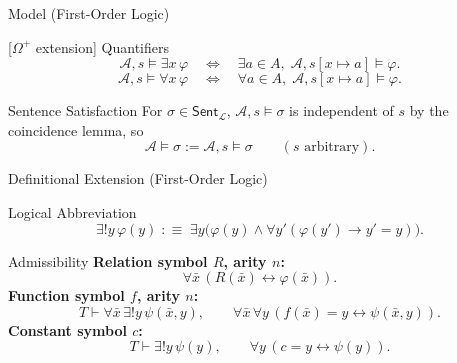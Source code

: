 \documentclass[12pt, a4paper]{report}
\begin{document}
\begin{modelbox}{Model (First-Order Logic)}
\begin{model}
\begin{modelcomponent}{[\(\Omega^{+}\) extension] Quantifiers}
\[
  \mathcal A,s\models\exists x\,\varphi
  \quad\Longleftrightarrow\quad
  \exists a\in A,\;\mathcal A,s[x\mapsto a]\models\varphi.
\]
\[
  \mathcal A,s\models\forall x\,\varphi
  \quad\Longleftrightarrow\quad
  \forall a\in A,\;\mathcal A,s[x\mapsto a]\models\varphi.
\]
\end{modelcomponent}

\begin{modelcomponent}{Sentence Satisfaction}
For \(\sigma\in\mathsf{Sent}_{\mathcal L}\), \(\mathcal A,s\models\sigma\) is
independent of \(s\) by the coincidence lemma, so
\[
  \mathcal A\models\sigma
  :=
  \mathcal A,s\models\sigma
  \qquad(s\text{ arbitrary}).
\]
\end{modelcomponent}

\begin{modelconsequences}
\end{modelconsequences}
\end{model}
\end{modelbox}

\begin{modelbox}{Definitional Extension (First-Order Logic)}

\begin{modelcomponent}{Logical Abbreviation}
\[
  \exists!y\,\varphi(y)
  \;:\equiv\;
  \exists y\bigl(\varphi(y)\wedge
  \forall y'(\varphi(y')\to y'=y)\bigr).
\]
\end{modelcomponent}

\begin{modelcomponent}{Admissibility}
\textbf{Relation symbol \(R\), arity \(n\):}
\[
  \forall\bar x\,(R(\bar x)\leftrightarrow\varphi(\bar x)).
\]
\textbf{Function symbol \(f\), arity \(n\):}
\[
  T\vdash \forall\bar x\,\exists!y\,\psi(\bar x,y),
  \qquad
  \forall\bar x\,\forall y\,(f(\bar x)=y\leftrightarrow\psi(\bar x,y)).
\]
\textbf{Constant symbol \(c\):}
\[
  T\vdash \exists!y\,\psi(y),
  \qquad
  \forall y\,(c=y\leftrightarrow\psi(y)).
\]
\end{modelcomponent}

\begin{modelconsequences}
  \modelconsequence{\[
    \mathcal A\models T
    \Longrightarrow
    \exists!\mathcal A^{+}\,
    (\mathcal A^{+}\!\upharpoonright\mathcal L=\mathcal A).
  \]}
\end{modelconsequences}
\end{modelbox}
\end{document}
